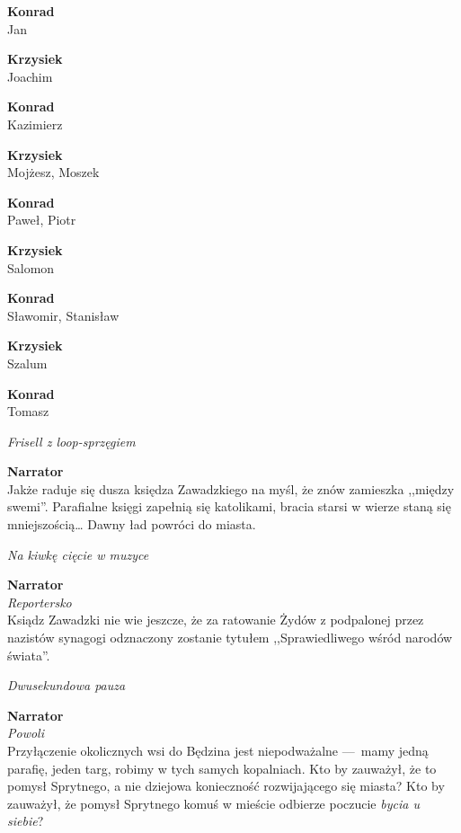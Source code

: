 \documentclass[11pt,a4paper,oneside]{article}
\begin{document}
{\color{konrad}
\textbf{Konrad}\\
Jan
}

{\color{krzysiek}
\textbf{Krzysiek}\\
Joachim
}

{\color{konrad}
\textbf{Konrad}\\
Kazimierz
}

\newpage
{\color{krzysiek}
\textbf{Krzysiek}\\
Mojżesz,  Moszek
}

{\color{konrad}
\textbf{Konrad}\\
Paweł, Piotr
}

{\color{krzysiek}
\textbf{Krzysiek}\\
Salomon
}

{\color{konrad}
\textbf{Konrad}\\
Sławomir,  Stanisław
}

{\color{krzysiek}
\textbf{Krzysiek}\\
Szalum
}

{\color{konrad}
\textbf{Konrad}\\
Tomasz
}

{\color{light-gray} \emph{Frisell z loop-sprzęgiem}}

\textbf{Narrator}\\
Jakże raduje się dusza księdza Zawadzkiego na myśl, że znów zamieszka
,,między swemi''.  Parafialne księgi zapełnią się katolikami, bracia
starsi w wierze staną się mniejszością\dots{} Dawny ład powróci do miasta.

{\color{light-gray} \emph{Na kiwkę cięcie w muzyce}}

\textbf{Narrator}\\
{\color{light-gray} \emph{Reportersko}}\\
Ksiądz Zawadzki nie wie jeszcze, że za ratowanie Żydów z podpalonej
przez nazistów synagogi odznaczony zostanie tytułem ,,Sprawiedliwego
wśród narodów świata''.

{\color{light-gray} \emph{Dwusekundowa pauza}}

\textbf{Narrator}\\
{\color{light-gray} \emph{Powoli}}\\
Przyłączenie okolicznych wsi do Będzina jest niepodważalne \mbox{---}~mamy
jedną parafię, jeden targ, robimy w  tych samych kopalniach. Kto by
zauważył, że to pomysł Sprytnego, a nie dziejowa konieczność
rozwijającego się miasta?  Kto by zauważył, że pomysł Sprytnego komuś
w mieście odbierze poczucie \emph{bycia u siebie}?
\end{document}
